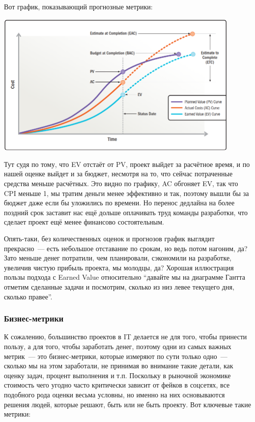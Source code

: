 \documentclass{../../text-style}
\begin{document}
Вот график, показывающий прогнозные метрики:

\begin{center}
    \includegraphics[width=0.9\textwidth]{eacEtcMetricsGraph.png}
\end{center}

Тут судя по тому, что EV отстаёт от PV, проект выйдет за расчётное время, и по нашей оценке выйдет и за бюджет, несмотря на то, что сейчас потраченные средства меньше расчётных. Это видно по графику, AC обгоняет EV, так что CPI меньше 1, мы тратим деньги менее эффективно и так, поэтому вышли бы за бюджет даже если бы уложились по времени. Но перенос дедлайна на более поздний срок заставит нас ещё дольше оплачивать труд команды разработки, что сделает проект ещё менее финансово состоятельным.

Опять-таки, без количественных оценок и прогнозов график выглядит прекрасно~--- есть небольшое отставание по срокам, но ведь потом нагоним, да? Зато меньше денег потратили, чем планировали, сэкономили на разработке, увеличив чистую прибыль проекта, мы молодцы, да? Хорошая иллюстрация пользы подхода с Earned Value относительно \enquote{давайте мы на диаграмме Гантта отметим сделанные задачи и посмотрим, сколько из низ левее текущего дня, сколько правее}.

\subsubsection{Бизнес-метрики}

К сожалению, большинство проектов в IT делается не для того, чтобы принести пользу, а для того, чтобы заработать денег, поэтому одни из самых важных метрик~--- это бизнес-метрики, которые измеряют по сути только одно~--- сколько мы на этом заработали, не принимая во внимание такие детали, как оценку задач, процент выполнения и т.п. Поскольку в рыночной экономике стоимость чего угодно часто критически зависит от фейков в соцсетях, все подобного рода оценки весьма условны, но именно на них основываются решения людей, которые решают, быть или не быть проекту. Вот ключевые такие метрики:
\end{document}
